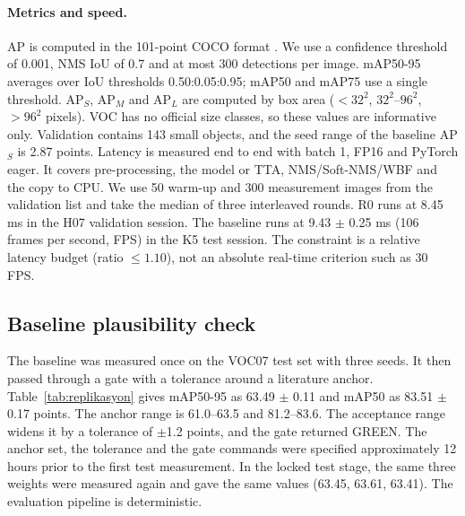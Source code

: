 \documentclass[pdflatex,iicol,sn-mathphys-num]{sn-jnl}
\begin{document}
\paragraph{Metrics and speed.}
AP is computed in the 101-point COCO format \cite{lin_2014_coco}. We use a confidence threshold of 0.001, NMS IoU of 0.7 and at most 300 detections per image. mAP50-95 averages over IoU thresholds 0.50:0.05:0.95; mAP50 and mAP75 use a single threshold. AP$_S$, AP$_M$ and AP$_L$ are computed by box area ($<32^2$, $32^2$--$96^2$, $>96^2$ pixels). VOC has no official size classes, so these values are informative only. Validation contains 143 small objects, and the seed range of the baseline AP$_S$ is 2.87 points. Latency is measured end to end with batch 1, FP16 and PyTorch eager. It covers pre-processing, the model or TTA, NMS/Soft-NMS/WBF and the copy to CPU. We use 50 warm-up and 300 measurement images from the validation list and take the median of three interleaved rounds. R0 runs at 8.45 ms in the H07 validation session. The baseline runs at 9.43 $\pm$ 0.25 ms (106 frames per second, FPS) in the K5 test session. The constraint is a relative latency budget (ratio $\le1.10$), not an absolute real-time criterion such as 30 FPS.

\subsection{Baseline plausibility check}\label{sec:replikasyon}



The baseline was measured once on the VOC07 test set with three seeds. It then passed through a gate with a tolerance around a literature anchor. Table~\ref{tab:replikasyon} gives mAP50-95 as 63.49 $\pm$ 0.11 and mAP50 as 83.51 $\pm$ 0.17 points. The anchor range is 61.0--63.5 and 81.2--83.6. The acceptance range widens it by a tolerance of $\pm$1.2 points, and the gate returned GREEN. The anchor set, the tolerance and the gate commands were specified approximately 12 hours prior to the first test measurement. In the locked test stage, the same three weights were measured again and gave the same values (63.45, 63.61, 63.41). The evaluation pipeline is deterministic.
\end{document}
